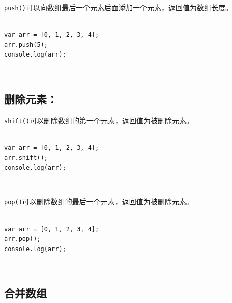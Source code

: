 \lstinline|push()|可以向数组最后一个元素后面添加一个元素，返回值为数组长度。 \\

 \\

\begin{lstlisting}[style=htmlcssjs]
var arr = [0, 1, 2, 3, 4];
arr.push(5);
console.log(arr);
\end{lstlisting}

\begin{tcolorbox}
	 \\
	\text{[0, 1, 2, 3, 4, 5]}
\end{tcolorbox}

\subsection{删除元素：}

\lstinline|shift()|可以删除数组的第一个元素，返回值为被删除元素。 \\

 \\

\begin{lstlisting}[style=htmlcssjs]
var arr = [0, 1, 2, 3, 4];
arr.shift();
console.log(arr);
\end{lstlisting}

\begin{tcolorbox}
	 \\
	\text{[1, 2, 3, 4]}
\end{tcolorbox}

\lstinline|pop()|可以删除数组的最后一个元素，返回值为被删除元素。 \\

 \\

\begin{lstlisting}[style=htmlcssjs]
var arr = [0, 1, 2, 3, 4];
arr.pop();
console.log(arr);
\end{lstlisting}

\begin{tcolorbox}
	 \\
	\text{[0, 1, 2, 3]}
\end{tcolorbox}

\subsection{合并数组}

